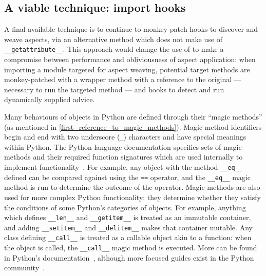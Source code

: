 \subsection{A viable technique: import hooks}\label{subsec:pdsf3importhookdiscussion}


A final available technique is to continue to monkey-patch hooks to discover and
weave aspects, via an alternative method which does not make use of
\lstinline{__getattribute__}. This approach would change the use of \pdsf{} to
make a compromise between performance and obliviousness of aspect application:
when importing a module targeted for aspect weaving, potential target methods
are monkey-patched with a wrapper method with a reference to the original ---
necessary to run the targeted method --- and hooks to detect and run dynamically
supplied advice.

Many behaviours of objects in Python are defined through their ``magic
methods'' (as mentioned in \cref{first_reference_to_magic_methods}). Magic method
identifiers begin and end with two underscore (\lstinline{_}) characters and
have special meanings within Python. The Python language documentation specifies
sets of magic methods and their required function signatures which are used
internally to implement functionality~\cite{py3docs}. For example, any object
with the method \lstinline{__eq__} defined can be compared against using the
\lstinline{==} operator, and the \lstinline{__eq__} magic method is run to
determine the outcome of the operator. Magic methods are also used for more
complex Python functionality: they determine whether they satisfy the conditions
of some Python's categories of objects. For example, anything which defines
\lstinline{__len__} and \lstinline{__getitem__} is treated as an immutable
container, and adding \lstinline{__setitem__} and \lstinline{__delitem__} makes
that container mutable. Any class defining \lstinline{__call__} is treated as a
callable object akin to a function: when the object is called, the
\lstinline{__call__} magic method is executed. More can be found in Python's
documentation~\cite{py3docs}, although more focused guides exist in the Python
community~\cite{magicmethodguide}.

